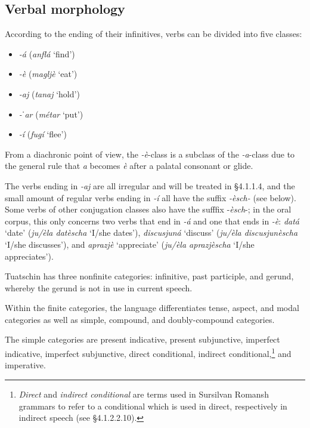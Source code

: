 \subsection{Verbal morphology}
According to the ending of their infinitives, verbs can be divided into five classes:

\begin{itemize}

\item \textit{-á} (\textit{anflá} `find')
\item \textit{-è} (\textit{magljè} `eat')
\item  \textit{-aj} (\textit{tanaj} `hold')
\item \textit{-ˈar} (\textit{métar} `put')
\item \textit{-í} (\textit{fugí} `flee')
\end{itemize}

From a diachronic point of view, the \textit{-è}-class is a subclass of the \textit{-a}-class due to the general rule that \textit{a} becomes \textit{è} after a palatal consonant or glide.

The verbs ending in \textit{-aj} are all irregular and will be treated in §4.1.1.4, and the small amount of regular verbs ending in \textit{-í} all have the suffix \textit{-èsch-} (see  below). Some verbs of other conjugation classes also have the sufffix -\textit{èsch}-; in the oral corpus, this only concerns two verbs that end in \textit{-á} and one that ends in \textit{-è}: \textit{datá} `date' (\textit{ju/èla datèscha} `I/she dates'), \textit{discusjuná} `discuss' (\textit{ju/èla discusjunèscha} `I/she discusses'), and \textit{aprazjè} `appreciate' (\textit{ju/èla aprazjèscha} `I/she appreciates').

Tuatschin has three nonfinite categories: infinitive, past participle, and gerund, whereby the gerund is not in use in current speech.

Within the finite categories, the language differentiates tense, aspect, and modal categories as well as simple,  compound, and doubly-compound categories.

The simple categories are present indicative, present subjunctive, imperfect indicative, imperfect subjunctive, direct conditional, indirect conditional,\footnote{\textit{Direct} and \textit{indirect conditional} are terms used in Sursilvan Romansh grammars to refer to a conditional which is used in direct, respectively in indirect speech (see §4.1.2.2.10).} and imperative.

